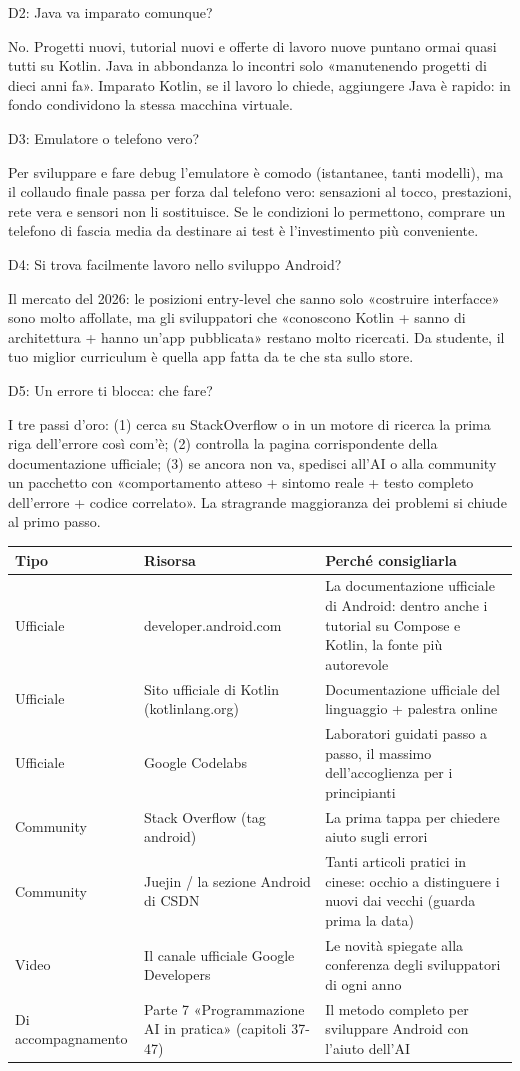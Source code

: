 D2: Java va imparato comunque?

No. Progetti nuovi, tutorial nuovi e offerte di lavoro nuove puntano ormai quasi tutti su Kotlin. Java in abbondanza lo incontri solo «manutenendo progetti di dieci anni fa». Imparato Kotlin, se il lavoro lo chiede, aggiungere Java è rapido: in fondo condividono la stessa macchina virtuale.

D3: Emulatore o telefono vero?

Per sviluppare e fare debug l'emulatore è comodo (istantanee, tanti modelli), ma il collaudo finale passa per forza dal telefono vero: sensazioni al tocco, prestazioni, rete vera e sensori non li sostituisce. Se le condizioni lo permettono, comprare un telefono di fascia media da destinare ai test è l'investimento più conveniente.

D4: Si trova facilmente lavoro nello sviluppo Android?

Il mercato del 2026: le posizioni entry-level che sanno solo «costruire interfacce» sono molto affollate, ma gli sviluppatori che «conoscono Kotlin + sanno di architettura + hanno un'app pubblicata» restano molto ricercati. Da studente, il tuo miglior curriculum è quella app fatta da te che sta sullo store.

D5: Un errore ti blocca: che fare?

I tre passi d'oro: (1) cerca su StackOverflow o in un motore di ricerca la prima riga dell'errore così com'è; (2) controlla la pagina corrispondente della documentazione ufficiale; (3) se ancora non va, spedisci all'AI o alla community un pacchetto con «comportamento atteso + sintomo reale + testo completo dell'errore + codice correlato». La stragrande maggioranza dei problemi si chiude al primo passo.


\begin{center}
\begin{tabularx}{\linewidth}{|X|X|X|}
\hline
\textbf{Tipo} & \textbf{Risorsa} & \textbf{Perché consigliarla} \tabularnewline
\hline
Ufficiale & developer.android.com & La documentazione ufficiale di Android: dentro anche i tutorial su Compose e Kotlin, la fonte più autorevole \tabularnewline
Ufficiale & Sito ufficiale di Kotlin (kotlinlang.org) & Documentazione ufficiale del linguaggio + palestra online \tabularnewline
Ufficiale & Google Codelabs & Laboratori guidati passo a passo, il massimo dell'accoglienza per i principianti \tabularnewline
Community & Stack Overflow (tag android) & La prima tappa per chiedere aiuto sugli errori \tabularnewline
Community & Juejin / la sezione Android di CSDN & Tanti articoli pratici in cinese: occhio a distinguere i nuovi dai vecchi (guarda prima la data) \tabularnewline
Video & Il canale ufficiale Google Developers & Le novità spiegate alla conferenza degli sviluppatori di ogni anno \tabularnewline
Di accompagnamento & Parte 7 «Programmazione AI in pratica» (capitoli 37-47) & Il metodo completo per sviluppare Android con l'aiuto dell'AI \tabularnewline
\hline
\end{tabularx}
\end{center}

